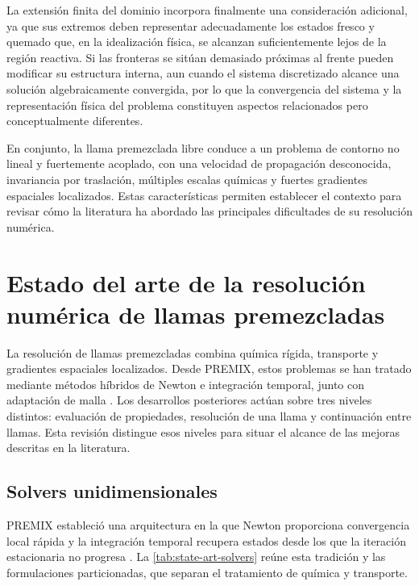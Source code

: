 \documentclass[12pt,a4paper,twoside,openany]{book}
\begin{document}
La extensión finita del dominio incorpora finalmente una consideración
adicional, ya que sus extremos deben representar adecuadamente los estados
fresco y quemado que, en la idealización física, se alcanzan suficientemente
lejos de la región reactiva. Si las fronteras se sitúan demasiado próximas al
frente pueden modificar su estructura interna, aun cuando el sistema
discretizado alcance una solución algebraicamente convergida, por lo que la
convergencia del sistema y la representación física del problema constituyen
aspectos relacionados pero conceptualmente diferentes.

En conjunto, la llama premezclada libre conduce a un problema de contorno no
lineal y fuertemente acoplado, con una velocidad de propagación desconocida,
invariancia por traslación, múltiples escalas químicas y fuertes gradientes
espaciales localizados. Estas características permiten establecer el contexto
para revisar cómo la literatura ha abordado las principales dificultades de su
resolución numérica.




\section{Estado del arte de la resolución numérica de llamas premezcladas}
\label{sec:state-art-flames}

La resolución de llamas premezcladas combina química rígida, transporte y
gradientes espaciales localizados. Desde PREMIX, estos problemas se han tratado
mediante métodos híbridos de Newton e integración temporal, junto con adaptación
de malla \cite{KeePremix1998,Grcar1988}. Los desarrollos posteriores actúan sobre
tres niveles distintos: evaluación de propiedades, resolución de una llama y
continuación entre llamas. Esta revisión distingue esos niveles para situar el
alcance de las mejoras descritas en la literatura.

\subsection{Solvers unidimensionales}
\label{sec:premix-1d-formulation}

PREMIX estableció una arquitectura en la que Newton proporciona convergencia
local rápida y la integración temporal recupera estados desde los que la
iteración estacionaria no progresa \cite{KeePremix1998,Grcar1988}.
La \cref{tab:state-art-solvers} reúne esta tradición y las formulaciones
particionadas, que separan el tratamiento de química y transporte.
\end{document}
